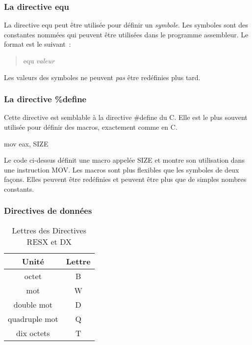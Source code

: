 \subsubsection{La directive equ}

La directive {\code equ} peut être utilisée pour définir un \emph{symbole}. Les symboles
sont des constantes nommées qui peuvent être utilisées dans le programme assembleur.
Le format est le suivant~:
\begin{quote}
   equ {\em valeur}
\end{quote}
Les valeurs des symboles ne peuvent \emph{pas} être redéfinies plus tard.

\subsubsection{La directive \%define}

Cette directive est semblable à la directive {\code \#define} du C. Elle est
le plus souvent utilisée pour définir des macros, exactement comme en C.
\begin{AsmCodeListing}[frame=none, numbers=none]
      mov    eax, SIZE
\end{AsmCodeListing}
Le code ci-dessus définit une macro appelée {\code SIZE} et montre son utilisation
dans une instruction {\code MOV}. Les macros sont plus flexibles que les symboles
de deux façons. Elles peuvent être redéfinies et peuvent être plus que de simples
nombres constants.

\subsubsection{Directives de données}

\begin{table}[t]
\centering
\begin{tabular}{||c|c||} \hline
{\bf Unité} & {\bf Lettre} \\
\hline
octet & B \\
mot & W \\
double mot & D \\
quadruple mot & Q \\
dix octets & T \\
\hline
\end{tabular}
\caption{Lettres des Directives {\code RESX} et {\code DX}
         \label{tab:size-letters} }
\end{table}


